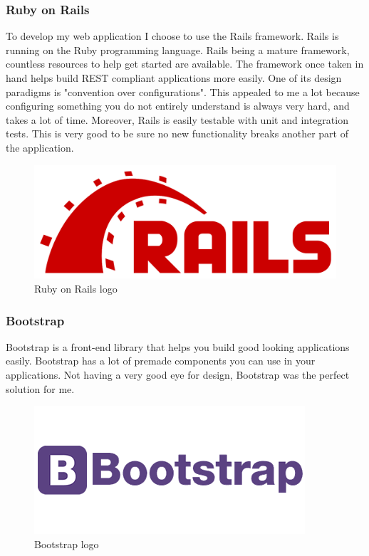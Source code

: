 \documentclass[12pt,a4paper]{article}
\begin{document}
\subsubsection{Ruby on Rails}
To develop my web application I choose to use the Rails framework.
Rails is running on the Ruby programming language. Rails being a mature
framework, countless resources to help get started are available. The framework
once taken in hand helps build REST compliant applications more easily. One
of its design paradigms is "convention over configurations". This appealed to
me a lot because configuring something you do not entirely understand is always very
hard, and takes a lot of time. Moreover, Rails is easily testable with unit and
integration tests. This is very good to be sure no new functionality breaks
another part of the application.

\begin{figure}[h]
   \centering
   \includegraphics[scale=0.1]{src/rails_logo.png}
   \caption{\label{fig:rlogo} Ruby on Rails logo}
\end{figure}


\subsubsection{Bootstrap}

Bootstrap is a front-end library that helps you build good looking applications
easily. Bootstrap has a lot of premade components you can use in your
applications. Not having a very good eye for design, Bootstrap was the perfect
solution for me.

\begin{figure}[h]
   \centering
   \includegraphics[scale=0.5]{src/bootstrap_logo.png}
   \caption{\label{fig:blogo} Bootstrap logo}
\end{figure}
\end{document}
